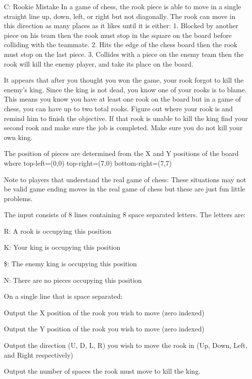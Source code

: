 \begin{problem}{C: Rookie Mistake}
In a game of chess, the rook piece is able to move in a single straight line up, down, left, or right but not diagonally.
The rook can move in this direction as many places as it likes until it is either:
1. Blocked by another piece on his team then the rook must stop in the square on the board before colliding with the teammate.
2. Hits the edge of the chess board then the rook must stop on the last piece.
3. Collides with a piece on the enemy team then the rook will kill the enemy player, and take its place on the board.

It appears that after you thought you won the game, your rook forgot to kill the enemy's king.
Since the king is not dead, you know one of your rooks is to blame.
This means you know you have at least one rook on the board but in a game of chess, you can have up to two total rooks.
Figure out where your rook is and remind him to finish the objective.
If that rook is unable to kill the king find your second rook and make sure the job is completed.
Make sure you do not kill your own king.

The position of pieces are determined from the X and Y positions of the board where
top-left=(0,0)     top-right=(7,0)     bottom-right=(7,7)

Note to players that understand the real game of chess: These situations may not be valid game ending moves in the real game of chess but these are just fun little problems.
\end{problem}

\begin{formalin}
The input consists of 8 lines containing 8 space separated letters.
The letters are:

R: A rook is occupying this position

K: Your king is occupying this position

\$: The enemy king is occupying this position

N: There are no pieces occupying this position
\end{formalin}

\begin{formalout}
On a single line that is space separated:

Output the X position of the rook you wish to move (zero indexed)

Output the Y position of the rook you wish to move (zero indexed)

Output the direction (U, D, L, R) you wish to move the rook in (Up, Down, Left, and Right respectively)

Output the number of spaces the rook must move to kill the king.
\end{formalout}

